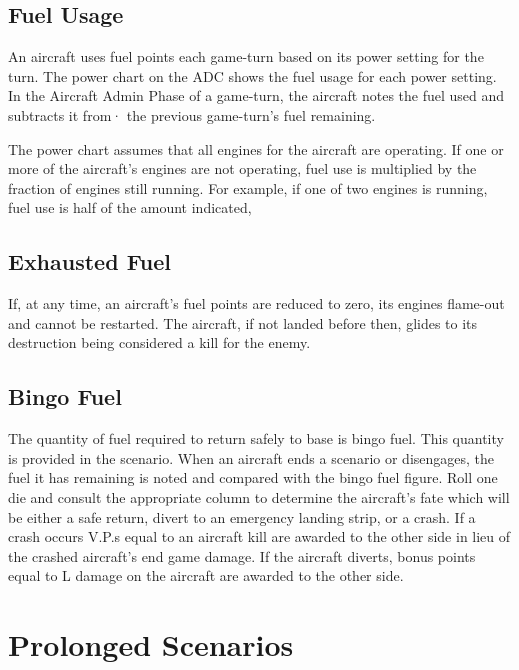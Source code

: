 \subsection{Fuel Usage} An aircraft uses fuel points each game-turn based on its power setting for the turn. The power chart on the ADC shows the fuel usage for each power setting. In the Aircraft Admin Phase of a game-turn, the aircraft notes the fuel used and subtracts it from· the previous game-turn's fuel remaining.

The power chart assumes that all engines for the aircraft are operating. If one or more of the aircraft's engines are not operating, fuel use is multiplied by the fraction of engines still running. For example, if one of two engines is running, fuel use is half of the amount indicated,

\subsection{Exhausted Fuel} If, at any time, an aircraft's fuel points are reduced to zero, its engines flame-out and cannot be restarted. The aircraft, if not landed before then, glides to its destruction being considered a kill for the enemy.


\subsection{Bingo Fuel} The quantity of fuel required to return safely to base is bingo fuel. This quantity is provided in the scenario. When an aircraft ends a scenario or disengages, the fuel it has remaining is noted and compared with the bingo fuel figure. Roll one die and consult the appropriate column  to determine the aircraft's fate which will be either a safe return, divert to an emergency landing strip, or a crash. If a crash occurs V.P.s equal to an aircraft kill are awarded to the other side in lieu of the crashed aircraft's end game damage. If the aircraft diverts, bonus points equal to L damage on the aircraft are awarded to the other side.

\section{Prolonged Scenarios}
\label{rule:prolonged-scenarios}

